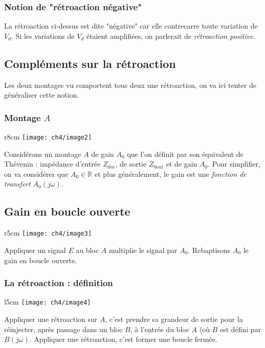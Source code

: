 		\subsubsection{Notion de "rétroaction négative"}
		La rétroaction ci-dessus est dite "négative" car elle contrecarre 
		toute variation de $V_d$. Si les variations de $V_d$ étaient 
		amplifiées, on parlerait de \textit{rétroaction positive}.



	\subsection{Compléments sur la rétroaction}
	Les deux montages vu comportent tous deux une rétroaction, on va ici 
	tenter de généraliser cette notion.
		
		\subsubsection{Montage $A$}
		\begin{wrapfigure}[5]{r}{8cm}
		\vspace{-8mm}
		\texttt{[image: ch4/image2]}
		\end{wrapfigure}
		Considérons un montage $A$ de gain $A_0$ que l'on définit par 
		son équivalent de Thévenin : impédance d'entrée $Z_{0in}$, de 
		sortie $Z_{0out}$ et de gain $A_0$. Pour simplifier, on va 
		considérer que $A_0 \in \mathbb{R}$ et plus généralement, le 
		gain est une \textit{fonction de transfert} $A_0(j\omega)$.
		
		\newpage
		\subsection{Gain en boucle ouverte}
		\begin{wrapfigure}[3]{r}{5cm}
		\vspace{-7mm}
		\texttt{[image: ch4/image3]}
		\end{wrapfigure}
		Appliquer un signal $E$ au bloc $A$ multiplie le signal par 
		$A_0$. Rebaptisons $A_0$ le gain en boucle ouverte.
		
		\subsubsection{La rétroaction : définition}
		\begin{wrapfigure}[4]{l}{5cm}
		\vspace{-7mm}
		\texttt{[image: ch4/image4]}
		\end{wrapfigure}
		Appliquer une rétroaction sur $A$, c'est prendre sa grandeur 
		de sortie pour la réinjecter, après passage dans un bloc $B$, 
		à l'entrée du bloc $A$ (où $B$ est défini par $B(j\omega)$. 
		Appliquer une rétroaction, c'est former une boucle fermée.\\
		
